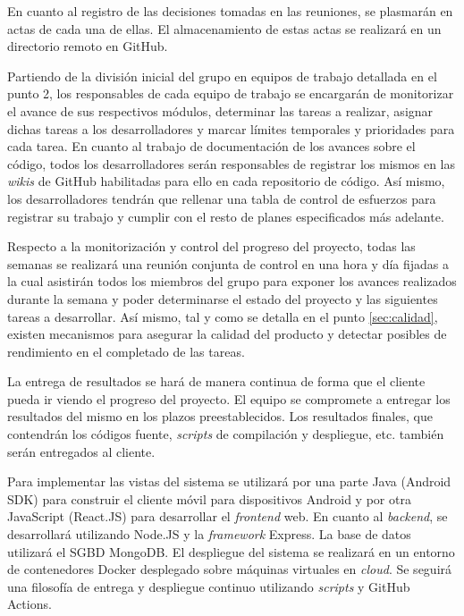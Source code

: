 \documentclass{article}
\begin{document}
En cuanto al registro de las decisiones tomadas en las reuniones, se plasmarán en actas de cada una de ellas. El almacenamiento de estas actas se realizará en un directorio remoto en GitHub.

Partiendo de la división inicial del grupo en equipos de trabajo detallada en el punto 2, los responsables de cada equipo de trabajo se encargarán de monitorizar el avance de sus respectivos módulos, determinar las tareas a realizar, asignar dichas tareas a los desarrolladores y marcar límites temporales y prioridades para cada tarea. En cuanto al trabajo de documentación de los avances sobre el código, todos los desarrolladores serán responsables de registrar los mismos en las \textit{wikis} de GitHub habilitadas para ello en cada repositorio de código. Así mismo, los desarrolladores tendrán que rellenar una tabla de control de esfuerzos para registrar su trabajo y cumplir con el resto de planes especificados más adelante.


\pagebreak

Respecto a la monitorización y control del progreso del proyecto, todas las semanas se realizará una reunión conjunta de control en una hora y día fijadas a la cual asistirán todos los miembros del grupo para exponer los avances realizados durante la semana y poder determinarse el estado del proyecto y las siguientes tareas a desarrollar. Así mismo, tal y como se detalla en el punto \ref{sec:calidad}, existen mecanismos para asegurar la calidad del producto y detectar posibles de rendimiento en el completado de las tareas.

La entrega de resultados se hará de manera continua de forma que el cliente pueda ir viendo el progreso del proyecto. El equipo se compromete a entregar los resultados del mismo en los plazos preestablecidos. Los resultados finales, que contendrán los códigos fuente, \textit{scripts} de compilación y despliegue, etc. también serán entregados al cliente.

Para implementar las vistas del sistema se utilizará por una parte Java (Android SDK) para construir el cliente móvil para dispositivos Android y por otra JavaScript (React.JS) para desarrollar el \textit{frontend} web. En cuanto al \textit{backend}, se desarrollará utilizando Node.JS y la \textit{framework} Express. La base de datos utilizará el SGBD MongoDB. El despliegue del sistema se realizará en un entorno de contenedores Docker desplegado sobre máquinas virtuales en \textit{cloud}. Se seguirá una filosofía de entrega y despliegue continuo utilizando \textit{scripts} y GitHub Actions.
\end{document}
